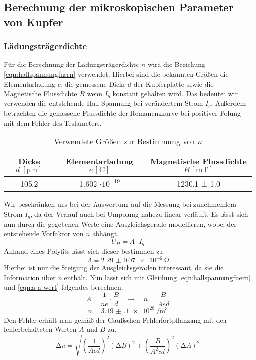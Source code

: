 \subsection{Berechnung der mikroskopischen Parameter von Kupfer}
\subsubsection{Lädungsträgerdichte}
Für die Berechnung der Lädungsträgerdichte $n$ wird die Beziehung \eqref{eqn:hallspannungfuern} verwendet. Hierbei sind die 
bekannten Größen die Elementarladung $e$, die gemessene Dicke $d$ der Kupferplatte sowie die Magnetische Flussdichte $B$ wenn $I_{b}$ konstant gehalten wird.
Das bedeutet wir verwenden die entstehende Hall-Spannung bei verändertem Strom $I_{q}$.
Außerdem betrachten die gemessene Flussdichte der Remanenzkurve bei positiver Polung mit dem Fehler des Teslameters.
\begin{table}
  \centering
  \caption{Verwendete Größen zur Bestimmung von $n$}
  \label{tab:nbestimmung}
  \begin{tabular}{c c c}
    Dicke {$d \: [\si{\micro\meter}]$} & Elementarladung $e \, [\si{\coulomb}]$ & Magnetische Flussdichte $B \, [\si{\milli\tesla}]$ \\
    \midrule
    105.2   & 1.602 $\cdot 10^{-19}$ & 1230.1 ± 1.0 \\
    \bottomrule
  \end{tabular}
\end{table}
Wir beschränken uns bei der Auswertung auf die Messung bei zunehmendem Strom ${I_{q}}$, da der Verlauf auch bei Umpolung nahezu linear verläuft.
Es lässt sich nun durch die gegebenen Werte eine Ausgleichsgerade modellieren, wobei der entstehende Vorfaktor von $n$ abhängt.
\begin{equation}
U_{H} = A \cdot I_{q}
\end{equation}
Anhand eines Polyfits lässt sich dieser bestimmen zu
\begin{equation}
\label{eqn:a-a-wert}
A = \SI{2.29(7)e-6}{\ohm}
\end{equation}
Hierbei ist nur die Steigung der Ausgleichsgeraden interessant, da sie die Information über $n$ enthält.
Nun lässt sich mit Gleichung \eqref{eqn:hallspannungfuern} und \eqref{eqn:a-a-wert} folgendes berechnen.
\begin{equation}
A = \frac{1}{n e} \cdot \frac{B}{d} \quad \to \quad n = \frac{B}{Aed}
\end{equation}
\begin{equation}
\label{eqn:nwert}
n = \SI{3.19(10)e28}{\per\meter\cubed}
\end{equation}
Den Fehler erhält man gemäß der Gaußschen Fehlerfortpflanzung mit den fehlerbehafteten Werten $A$ und $B$ zu.
\begin{equation}
\increment n = \sqrt{\left( \frac{1}{A e d}\right)^{2} (\increment B)^{2} + \left( \frac{B}{A^{2} e d}\right)^{2} (\increment A)^{2}}
\end{equation}
